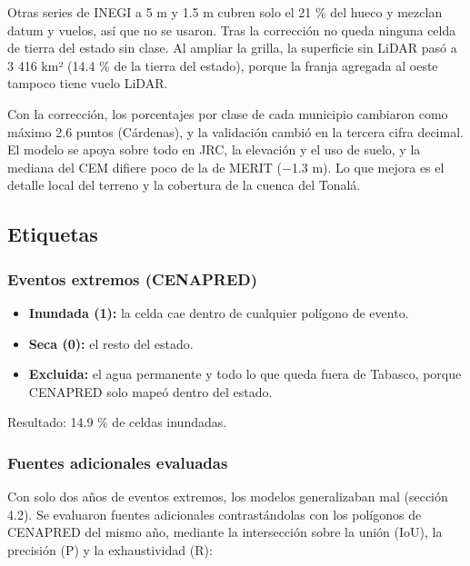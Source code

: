 Otras series de INEGI a 5 m y 1.5 m cubren solo el 21 \% del hueco y mezclan datum y vuelos, así que no se usaron. Tras la corrección no queda ninguna celda de tierra del estado sin clase. Al ampliar la grilla, la superficie sin LiDAR pasó a 3 416 km² (14.4 \% de la tierra del estado), porque la franja agregada al oeste tampoco tiene vuelo LiDAR.

Con la corrección, los porcentajes por clase de cada municipio cambiaron como máximo 2.6 puntos (Cárdenas), y la validación cambió en la tercera cifra decimal. El modelo se apoya sobre todo en JRC, la elevación y el uso de suelo, y la mediana del CEM difiere poco de la de MERIT (−1.3 m). Lo que mejora es el detalle local del terreno y la cobertura de la cuenca del Tonalá.

\subsection{Etiquetas}

\subsubsection{Eventos extremos (CENAPRED)}

\begin{itemize}
\tightlist
\item
  \textbf{Inundada (1):} la celda cae dentro de cualquier polígono de evento.
\item
  \textbf{Seca (0):} el resto del estado.
\item
  \textbf{Excluida:} el agua permanente y todo lo que queda fuera de Tabasco, porque CENAPRED solo mapeó dentro del estado.
\end{itemize}

Resultado: 14.9 \% de celdas inundadas.

\subsubsection{Fuentes adicionales evaluadas}

Con solo dos años de eventos extremos, los modelos generalizaban mal (sección 4.2). Se evaluaron fuentes adicionales contrastándolas con los polígonos de CENAPRED del mismo año, mediante la intersección sobre la unión (IoU), la precisión (P) y la exhaustividad (R):

